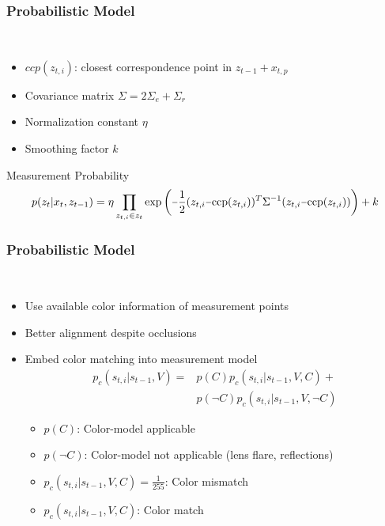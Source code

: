 \begin{frame}
  \frametitle{Probabilistic Model}
  \begin{description}[]
  \item[Measurement Model Computation] \hfill \\
  \begin{itemize}
  \item $ccp(z_{t,i})$: closest correspondence point in $z_{t-1}+x_{t,p}$
  \pause
  \item Covariance matrix $\Sigma = 2\Sigma_e+\Sigma_r$
  \pause
  \item Normalization constant $\eta$
  \item Smoothing factor $k$
  \end{itemize}
  \end{description}     
  \begin{block}{Measurement Probability}
  \small
  $$
  p(z_t|x_t,z_{t-1}) =
  \eta\prod\limits_{z_{t,i}\in z_t}
  \mathrm{exp}\left(\unaryminus\frac{1}{2}(z_{t,i}\unaryminus\mathrm{ccp}(z_{t,i}))^T\Sigma^{\unaryminus 1}(z_{t,i}\unaryminus\mathrm{ccp}(z_{t,i}))\right)+k
  \nonumber
  $$
  \end{block}
\end{frame}

\begin{frame}
  \frametitle{Probabilistic Model}
  \begin{description}[]
  \item[Adding Color] \hfill \\
  \begin{itemize}
  \item Use available color information of measurement points
  \item Better alignment despite occlusions
  \item Embed color matching into measurement model
  \begin{align}
p_c(s_{t,i}|s_{t-1},V)
  = &p(C)p_c(s_{t,i}|s_{t-1},V,C)+ \nonumber\\
&p(\neg C)p_c(s_{t,i}|s_{t-1},V,\neg C)\nonumber
  \end{align}
  \begin{itemize}
  \item $p(C)$: Color-model applicable
  \item $p(\neg C)$: Color-model not applicable (lens flare, reflections)
  \item $p_c(s_{t,i}|s_{t-1},V,C)=\frac{1}{255}$: Color mismatch
  \item $p_c(s_{t,i}|s_{t-1},V,C)$: Color match
  \end{itemize}
  \end{itemize}
  \end{description}
\end{frame}

